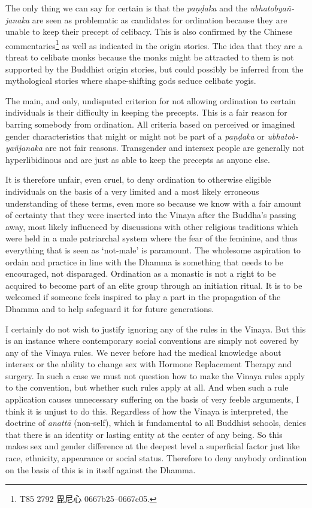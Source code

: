 The only thing we can say for certain is that the {\em paṇḍaka} and the {\em ubhatob­yañ­janaka} are seen as problematic as candidates for ordination because they are unable to keep their precept of celibacy. This is also confirmed by the Chinese commentaries\footnote{T85 2792 毘尼心 0667b25–0667c05.} as well as indicated in the origin stories. The idea that they are a threat to celibate monks because the monks might be attracted to them is not supported by the Buddhist origin stories, but could possibly be inferred from the mythological stories where shape-shifting gods seduce celibate yogis.

The main, and only, undisputed criterion for not allowing ordination to certain individuals is their difficulty in keeping the precepts. This is a fair reason for barring somebody from ordination. All criteria based on perceived or imagined gender characteristics that might or might not be part of a {\em paṇḍaka} or {\em ubhatob­yañ­janaka} are not fair reasons. Transgender and intersex people are generally not hyperlibidinous and are just as able to keep the precepts as anyone else. 

It is therefore unfair, even cruel, to deny ordination to otherwise eligible individuals on the basis of a very limited and a most likely erroneous understanding of these terms, even more so because we know with a fair amount of certainty that they were inserted into the Vinaya after the Buddha's passing away, most likely influenced by discussions with other religious traditions which were held in a male patriarchal system where the fear of the feminine, and thus everything that is seen as `not-male' is paramount. The wholesome aspiration to ordain and practice in line with the Dhamma is something that needs to be encouraged, not disparaged. Ordination as a monastic is not a right to be acquired to become part of an elite group through an initiation ritual. It is to be welcomed if someone feels inspired to play a part in the propagation of the Dhamma and to help safeguard it for future generations. 

I certainly do not wish to justify ignoring any of the rules in the Vinaya. But this is an instance where contemporary social conventions are simply not covered by any of the Vinaya rules. We never before had the medical knowledge about intersex or the ability to change sex with Hormone Replacement Therapy and surgery. In such a case we must not question how to make the Vinaya rules apply to the convention, but whether such rules apply at all. And when such a rule application causes unnecessary suffering on the basis of very feeble arguments, I think it is unjust to do this. Regardless of how the Vinaya is interpreted, the doctrine of {\em anattā} (non-self), which is fundamental to all Buddhist schools, denies that there is an identity or lasting entity at the center of any being. So this makes sex and gender difference at the deepest level a superficial factor just like race, ethnicity, appearance or social status. Therefore to deny anybody ordination on the basis of this is in itself against the Dhamma.

